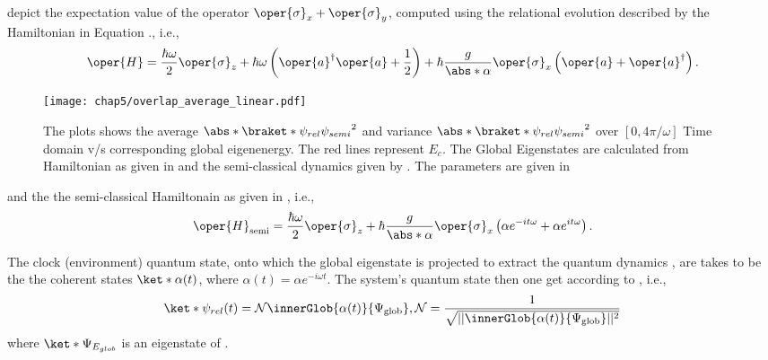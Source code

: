  depict the expectation value of the operator  \(\oper{\sigma}_x + \oper{\sigma}_y\), 
computed using the relational evolution described by the Hamiltonian in Equation ., i.e., 
\begin{eqnarray}
    \label{eq:chap5_JCM_Hamiltonian_linear}
    \oper{H} = \frac{\hbar \omega}{2} \oper{\sigma}_z + \hbar \omega \left(\oper{a}^\dagger \oper{a} + \frac{1}{2}\right) 
    + \hbar \frac{ g}{\abs*{\alpha}} \oper{\sigma}_x\left(\oper{a} + \oper{a}^\dagger\right).
\end{eqnarray}
\begin{figure}[!h]
    \centering
    \texttt{[image: chap5/overlap\_average\_linear.pdf]}
    \caption{
     The plots shows the average $\abs*{\braket*{\psi_{rel}}{\psi_{semi}}}^2$ and 
     variance $\abs*{\braket*{\psi_{rel}}{\psi_{semi}}}^2$ over \([0, 4\pi/\omega]\) Time domain v/s corresponding global eigenenergy. The red lines represent \(E_c\).
     The Global Eigenstates are calculated from 
    Hamiltonian as given in  and the semi-classical dynamics given by . The parameters 
    are given in }
     \label{fig:chap5_linear_overlap_avg}
\end{figure}
and the the semi-classical Hamiltonain as given in , i.e., 
\begin{eqnarray}
\label{eq:chap5_semi_classical_JC_Linear}
    \oper{H}_{\text{semi}} = \frac{\hbar\omega}{2} \oper{\sigma}_z 
    + \hbar \frac{g}{\abs*{\alpha}} \oper{\sigma}_x\left( \alpha e^{-it\omega} + \alpha e^{it\omega} \right).
\end{eqnarray}

The clock (environment) quantum state, onto which the global eigenstate is projected 
to extract the 
quantum dynamics , 
are takes to be the
the coherent states \(\ket*{\alpha (t)}\), where \(\alpha(t) = \alpha e^{-i\omega t}\). The system's quantum state then one get according to , i.e.,  
\begin{equation}
    \ket*{\psi_{rel}(t)} = \mathcal{N} \innerGlob{\alpha(t)}{\Psi_{\mathrm{glob}}},
    \mathcal{N} = \frac{1}{\sqrt{\lvert \lvert \innerGlob{\alpha(t)}{\Psi_{\mathrm{glob}}} \rvert \rvert^2}}
\end{equation}
where \(\ket*{\Psi_{E_{glob}}}\) is an eigenstate of . 

